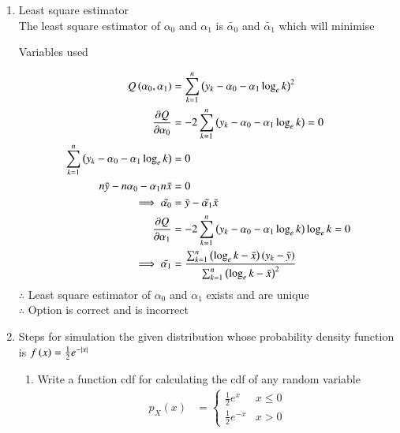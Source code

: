 \documentclass[journal,12pt,onecolumn]{IEEEtran}
\theoremstyle{remark}
\begin{document}
\begin{enumerate}
\begin{enumerate}
\item Least square estimator\\
The least square estimator of $\alpha_{0}$ and $\alpha_{1}$ is $\tilde{\alpha_{0}}$ and $\tilde{\alpha_{1}}$ which will minimise
\begin{table}[!htb]
	
	\caption{Variables used}
	\label{table_gate23_st_26}
\end{table}
\begin{align}
	Q\brak{\alpha_{0},\alpha_{1}} &=  \sum_{k = 1}^{n} \brak{y_{k}-\alpha_{0}-\alpha_{1} \log_{e}k}^2\\
\frac{\partial Q}{\partial \alpha_{0}} &= -2 \sum_{k = 1}^{n} \brak{y_{k}-\alpha_{0}-\alpha_{1} \log_{e}k} = 0\\
	\sum_{k = 1}^{n} \brak{y_{k}-\alpha_{0}-\alpha_{1} \log_{e}k} &= 0\\
	n\bar{y} - n\alpha_{0} - \alpha_{1}n\bar{x} &= 0 \\%
	\implies \tilde{\alpha_{0}} &= \bar{y} - \tilde{\alpha_{1}}\bar{x}\\
	\frac{\partial Q}{\partial \alpha_{1}} &= -2 \sum_{k = 1}^{n} \brak{y_{k}-\alpha_{0}-\alpha_{1} \log_{e}k}\log_{e}k = 0\\
	\implies \tilde{\alpha_{1}} &= \frac{\sum_{k = 1}^{n}\brak{\log_{e}k-\bar{x}}\brak{y_{k}-\bar{y}}}{\sum_{k = 1}^{n}\brak{\log_{e}k-\bar{x}}^2}
\end{align}
$\therefore$ Least square estimator of $\alpha_{0}$ and $\alpha_{1}$ exists and are unique\\
$\therefore$ Option  is correct and  is incorrect\\
\item Steps for simulation the given distribution whose 
	probability density function is $ f\left(x\right) = \frac{1}{2} e^{-|x|}$
\begin{enumerate}
\item Write a function cdf for calculating the cdf of any random variable\\
	 \begin{align}
  p_X(x) &= 
  \begin{cases}
          \frac{1}{2} e^{x} & x \le 0
  \\
          \frac{1}{2} e^{-x} &  x > 0
  \end{cases}
  \end{align}


\end{enumerate}
\end{enumerate}
\end{enumerate}
\end{document}
